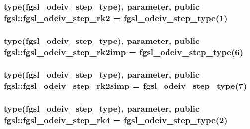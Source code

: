 \hypertarget{classfgsl_aa58b6af1260738ff3a83d7910e978b32}{
\subsubsection[{fgsl\-\_\-odeiv\-\_\-step\-\_\-rk2}]{\setlength{\rightskip}{0pt plus 5cm}type({\bf fgsl\-\_\-odeiv\-\_\-step\-\_\-type}), parameter, public fgsl\-::fgsl\-\_\-odeiv\-\_\-step\-\_\-rk2 = {\bf fgsl\-\_\-odeiv\-\_\-step\-\_\-type}(1)}}\label{classfgsl_aa58b6af1260738ff3a83d7910e978b32}
\hypertarget{classfgsl_a0352c460177df9a983fc5984dd5be04a}{
\subsubsection[{fgsl\-\_\-odeiv\-\_\-step\-\_\-rk2imp}]{\setlength{\rightskip}{0pt plus 5cm}type({\bf fgsl\-\_\-odeiv\-\_\-step\-\_\-type}), parameter, public fgsl\-::fgsl\-\_\-odeiv\-\_\-step\-\_\-rk2imp = {\bf fgsl\-\_\-odeiv\-\_\-step\-\_\-type}(6)}}\label{classfgsl_a0352c460177df9a983fc5984dd5be04a}
\hypertarget{classfgsl_aba1fcb32d594f9bfa4e3d81e79ea8bff}{
\subsubsection[{fgsl\-\_\-odeiv\-\_\-step\-\_\-rk2simp}]{\setlength{\rightskip}{0pt plus 5cm}type({\bf fgsl\-\_\-odeiv\-\_\-step\-\_\-type}), parameter, public fgsl\-::fgsl\-\_\-odeiv\-\_\-step\-\_\-rk2simp = {\bf fgsl\-\_\-odeiv\-\_\-step\-\_\-type}(7)}}\label{classfgsl_aba1fcb32d594f9bfa4e3d81e79ea8bff}
\hypertarget{classfgsl_a466a47d91e65ed8da5395e1e1cb53a2c}{
\subsubsection[{fgsl\-\_\-odeiv\-\_\-step\-\_\-rk4}]{\setlength{\rightskip}{0pt plus 5cm}type({\bf fgsl\-\_\-odeiv\-\_\-step\-\_\-type}), parameter, public fgsl\-::fgsl\-\_\-odeiv\-\_\-step\-\_\-rk4 = {\bf fgsl\-\_\-odeiv\-\_\-step\-\_\-type}(2)}}\label{classfgsl_a466a47d91e65ed8da5395e1e1cb53a2c}
